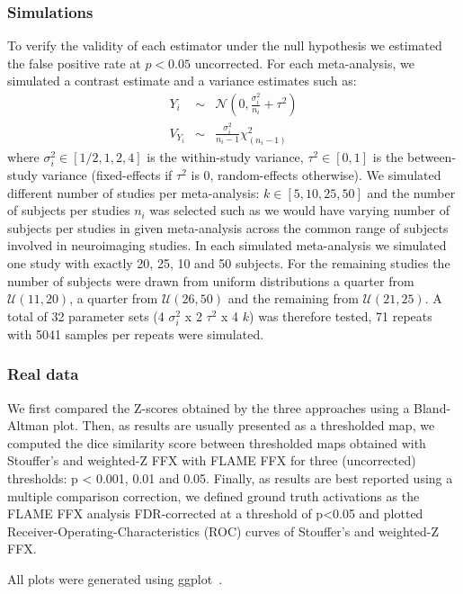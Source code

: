 \documentclass{llncs}
\newcommand{\effectvector}{Y}
\newcommand{\effect}[1][i]{\effectvector_{#1}}
\newcommand{\vareffect}[1][i]{V_{\effect[#1]}}
\newcommand{\nStudies}{k}
\newcommand{\varBetween}{\tau^2}
\newcommand{\sampleSize}[1][i]{n_{#1}}
\newcommand{\varWithin}[1][i]{\sigma^2_{#1}}
\begin{document}
\subsubsection{Simulations}
To verify the validity of each estimator under the null hypothesis we estimated the false positive rate at $p<0.05$ uncorrected. For each meta-analysis, we simulated a contrast estimate and a variance estimates such as:
\begin{eqnarray}
	\effect &\sim& \mathcal{N}(0, \frac{\varWithin}{\sampleSize}+\varBetween) \\
	\vareffect &\sim& \frac{\varWithin}{\sampleSize-1} \chi^2_{(\sampleSize-1)}%
\end{eqnarray}
where $\varWithin \in [1/2, 1, 2, 4]$ is the within-study variance, $\varBetween \in [0, 1]$ is the between-study variance (fixed-effects if $\varBetween$ is $0$, random-effects otherwise). We simulated different number of studies per meta-analysis: $\nStudies \in [5, 10, 25, 50]$ and the number of subjects per studies $\sampleSize$ was selected such as we would have varying number of subjects per studies in given meta-analysis across the common range of subjects involved in neuroimaging studies. In each simulated meta-analysis we simulated one study with exactly 20, 25, 10 and 50 subjects. For the remaining studies the number of subjects were drawn from uniform distributions a quarter from $\mathcal{U}(11,20)$, a quarter from $\mathcal{U}(26,50)$ and the remaining from $\mathcal{U}(21,25)$. A total of 32 parameter sets (4 $\varWithin$ x 2 $\varBetween$ x 4 $\nStudies$) was therefore tested, 71 repeats with 5041 samples per repeats were simulated.


\subsubsection{Real data}

We first compared the Z-scores obtained by the three approaches using a Bland-Altman plot. Then, as results are usually presented as a thresholded map, we computed the dice similarity score between thresholded maps obtained with Stouffer's and weighted-Z FFX with FLAME FFX for three (uncorrected) thresholds: p < 0.001, 0.01 and 0.05. Finally, as results are best reported using a multiple comparison correction, we defined ground truth activations as the FLAME FFX analysis FDR-corrected at a threshold of p<0.05 and plotted Receiver-Operating-Characteristics (ROC) curves of Stouffer's and weighted-Z FFX.

All plots were generated using ggplot~\cite{ggplot}.
\end{document}
